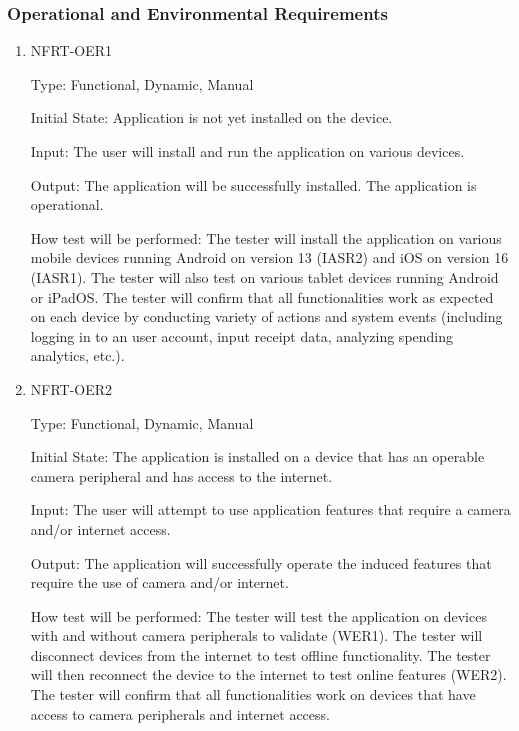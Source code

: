 \documentclass[12pt, titlepage]{article}
\begin{document}
\subsubsection{Operational and Environmental Requirements}

\begin{enumerate}
\item{NFRT-OER1\\}

Type: Functional, Dynamic, Manual

Initial State: Application is not yet installed on the device.
                
Input: The user will install and run the application on various devices.
                
Output: The application will be successfully installed. The application is operational.
                
How test will be performed: The tester will install the application on various mobile devices running Android on version 13 (IASR2) and iOS on version 16 (IASR1). The tester will also test on various tablet devices running Android or iPadOS. The tester will confirm that all functionalities work as expected on each device by conducting variety of actions and system events (including logging in to an user account, input receipt data, analyzing spending analytics, etc.).

\item{NFRT-OER2\\}

Type: Functional, Dynamic, Manual

Initial State: The application is installed on a device that has an operable camera peripheral and has access to the internet.
                
Input: The user will attempt to use application features that require a camera and/or internet access.
                
Output: The application will successfully operate the induced features that require the use of camera and/or internet.
                
How test will be performed: The tester will test the application on devices with and without camera peripherals to validate (WER1). The tester will disconnect devices from the internet to test offline functionality. The tester will then reconnect the device to the internet to test online features (WER2). The tester will confirm that all functionalities work on devices that have access to camera peripherals and internet access.


\end{enumerate}
\end{document}

